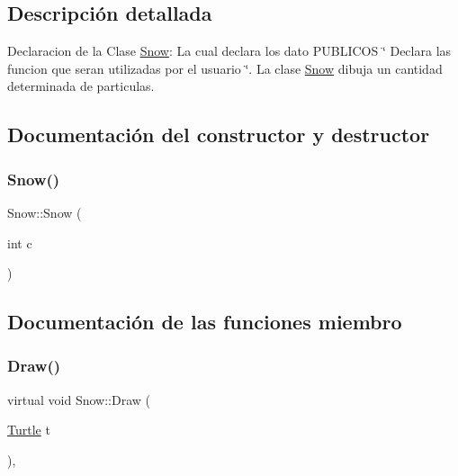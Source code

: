 \subsection{Descripción detallada}
Declaracion de la Clase \mbox{\hyperlink{class_snow}{Snow}}\+: La cual declara los dato P\+U\+B\+L\+I\+C\+OS \char`\"{} Declara las funcion que seran utilizadas por el usuario \char`\"{}. La clase \mbox{\hyperlink{class_snow}{Snow}} dibuja un cantidad determinada de particulas. 

\subsection{Documentación del constructor y destructor}
\mbox{\label{class_snow_ac696d06b015958c09d5fbb13d02bf8b6}} 
\subsubsection{\texorpdfstring{Snow()}{Snow()}}
{\footnotesize\ttfamily Snow\+::\+Snow (\begin{DoxyParamCaption}\item[{int}]{c }\end{DoxyParamCaption})\hspace{0.3cm}{\ttfamily [inline]}}



\subsection{Documentación de las funciones miembro}
\mbox{\label{class_snow_a4c8865c8e6ad4db203332acc90b65e85}} 
\subsubsection{\texorpdfstring{Draw()}{Draw()}}
{\footnotesize\ttfamily virtual void Snow\+::\+Draw (\begin{DoxyParamCaption}\item[{\mbox{\hyperlink{class_turtle}{Turtle}}}]{t }\end{DoxyParamCaption})\hspace{0.3cm}{\ttfamily [inline]}, {\ttfamily [virtual]}}

\mbox{\label{class_snow_a7e6b8cdef24b96f3e0d5e4d4d672985f}} 
